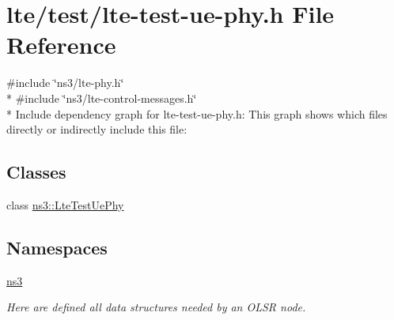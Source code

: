 \hypertarget{lte-test-ue-phy_8h}{}\section{lte/test/lte-\/test-\/ue-\/phy.h File Reference}
\label{lte-test-ue-phy_8h}
{\ttfamily \#include \char`\"{}ns3/lte-\/phy.\+h\char`\"{}}\\*
{\ttfamily \#include \char`\"{}ns3/lte-\/control-\/messages.\+h\char`\"{}}\\*
Include dependency graph for lte-\/test-\/ue-\/phy.h\+:
This graph shows which files directly or indirectly include this file\+:
\subsection*{Classes}
\begin{DoxyCompactItemize}
\item 
class \hyperlink{classns3_1_1LteTestUePhy}{ns3\+::\+Lte\+Test\+Ue\+Phy}
\end{DoxyCompactItemize}
\subsection*{Namespaces}
\begin{DoxyCompactItemize}
\item 
 \hyperlink{namespacens3}{ns3}
\begin{DoxyCompactList}\small\item\em Here are defined all data structures needed by an O\+L\+SR node. \end{DoxyCompactList}\end{DoxyCompactItemize}
